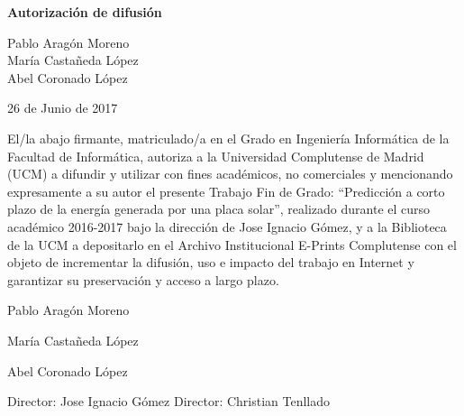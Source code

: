 
\newpage

\thispagestyle{empty}

\begin{center}

{\bf \Huge Autorización de difusión}

\vspace{1cm}

    {\large Pablo Aragón Moreno}\\
    {\large María Castañeda López}\\
    {\large Abel Coronado López}\\

   \vspace{0.5cm}

   26 de Junio de 2017\\
   \vspace{0.5cm}

\end{center}
   
El/la abajo firmante, matriculado/a en el Grado en Ingeniería Informática de la Facultad de Informática, autoriza a la Universidad Complutense de Madrid (UCM) a difundir y utilizar con fines académicos, no comerciales y mencionando expresamente a su autor el presente Trabajo Fin de Grado: “Predicción a corto plazo de la energía
    generada por una placa solar”, realizado durante el curso académico 2016-2017 bajo la dirección de Jose Ignacio Gómez, y a la Biblioteca de la UCM a depositarlo en el Archivo Institucional E-Prints Complutense con el objeto de incrementar la difusión, uso e impacto del trabajo en Internet y garantizar su preservación y acceso a largo plazo.

\vspace{2cm}

{\large Pablo Aragón Moreno}

\vspace{2.5cm}

{\large María Castañeda López}

\vspace{2.5cm}

{\large Abel Coronado López}

\vspace{2.5cm}

{\large Director: Jose Ignacio Gómez} \hspace{2cm} {\large Director: Christian Tenllado}